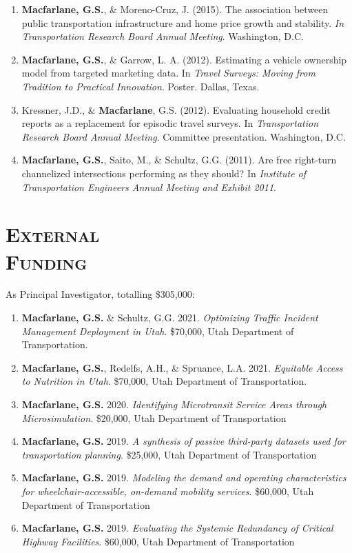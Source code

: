 \documentclass[margin,line]{res}
\newcounter{enuminitialize}
\newenvironment{myenum}[1][]
{%
 \setcounter{enuminitialize}{#1}
 \addtocounter{enuminitialize}{2}
 \begin{enumerate}[left= 4pt, itemsep=12pt, start=\value{enuminitialize}, label=\arabic*\addtocounter{enumi}{-2}]
}
{%
 \end{enumerate}
}
\newcommand{\secfont}{\scshape }
\begin{document}
\begin{resume}
\begin{myenum}[20]
\item \textbf{Macfarlane, G.S.}, \& Moreno-Cruz, J. (2015). The association between public transportation infrastructure and home price growth and stability. \textit{ In Transportation Research Board Annual Meeting}. Washington, D.C.
\item \textbf{Macfarlane, G.S.}, \& Garrow, L. A. (2012). Estimating a vehicle ownership model from targeted marketing data. In \textit{ Travel Surveys: Moving from Tradition to Practical Innovation}. Poster. Dallas, Texas.
\item Kressner, J.D., \& \textbf{Macfarlane}, G.S. (2012). Evaluating household credit reports as a replacement for episodic travel surveys. In \textit{ Transportation Research Board Annual Meeting}. Committee presentation. Washington, D.C.
\item \textbf{Macfarlane, G.S.}, Saito, M., \& Schultz, G.G. (2011). Are free right-turn channelized intersections performing as they should? In \textit{ Institute of Transportation Engineers Annual Meeting and Exhibit 2011}.
\end{myenum}



\noindent\makebox[\linewidth]{\rule{\linewidth}{0.4pt}}
\section{\secfont External \\Funding}

As Principal Investigator, totalling \$305,000:
\vspace{0.3cm}
\begin{myenum}[6]
  \item {\textbf{Macfarlane, G.S.} \& Schultz, G.G. 2021. \textit{Optimizing Traffic Incident Management Deployment in Utah}. \$70,000, Utah Department of Transportation.}
  \item {\textbf{Macfarlane, G.S.}, Redelfs, A.H., \& Spruance, L.A. 2021. \textit{Equitable Access to Nutrition in Utah}. \$70,000, Utah Department of Transportation.}
  \item {\textbf{Macfarlane, G.S.} 2020. \textit{ Identifying Microtransit Service Areas
through Microsimulation}. \$20,000, Utah Department of Transportation}
  \item {\textbf{Macfarlane, G.S.} 2019. \textit{ A synthesis of passive third-party datasets
used for transportation planning}. \$25,000, Utah Department of Transportation}
  \item {\textbf{Macfarlane, G.S.} 2019. \textit{ Modeling the demand and operating
characteristics for wheelchair-accessible, on-demand mobility services}.
\$60,000, Utah Department of Transportation}
  \item {\textbf{Macfarlane, G.S.} 2019. \textit{ Evaluating the Systemic Redundancy of
Critical Highway Facilities}. \$60,000, Utah Department of Transportation}
\end{myenum}


\end{resume}
\end{document}

